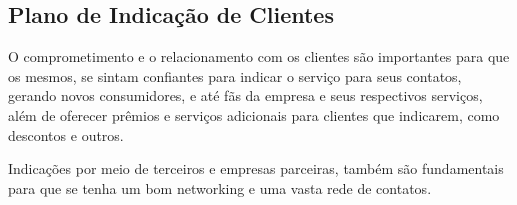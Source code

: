 \subsection{Plano de Indicação de Clientes}
\par O comprometimento e o relacionamento com os clientes são importantes para que os mesmos, se sintam confiantes para indicar o serviço para seus contatos, gerando novos consumidores, e até fãs da empresa e seus respectivos serviços, além de oferecer prêmios e serviços adicionais para clientes que indicarem, como descontos e outros.
\par Indicações por meio de terceiros e empresas parceiras, também são fundamentais para que se tenha um bom networking e uma vasta rede de contatos.
